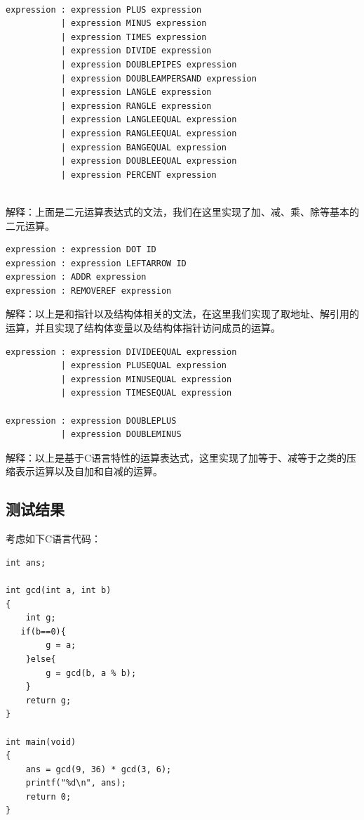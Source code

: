 \documentclass{article}
\begin{document}
\begin{verbatim}

expression : expression PLUS expression
           | expression MINUS expression
           | expression TIMES expression
           | expression DIVIDE expression
           | expression DOUBLEPIPES expression
           | expression DOUBLEAMPERSAND expression
           | expression LANGLE expression
           | expression RANGLE expression
           | expression LANGLEEQUAL expression
           | expression RANGLEEQUAL expression
           | expression BANGEQUAL expression
           | expression DOUBLEEQUAL expression
           | expression PERCENT expression
           
\end{verbatim}

解释：上面是二元运算表达式的文法，我们在这里实现了加、减、乘、除等基本的二元运算。

\begin{verbatim}
expression : expression DOT ID
expression : expression LEFTARROW ID
expression : ADDR expression
expression : REMOVEREF expression
\end{verbatim}

解释：以上是和指针以及结构体相关的文法，在这里我们实现了取地址、解引用的运算，并且实现了结构体变量以及结构体指针访问成员的运算。

\begin{verbatim}
expression : expression DIVIDEEQUAL expression
           | expression PLUSEQUAL expression
           | expression MINUSEQUAL expression
           | expression TIMESEQUAL expression

expression : expression DOUBLEPLUS
           | expression DOUBLEMINUS
\end{verbatim}

解释：以上是基于C语言特性的运算表达式，这里实现了加等于、减等于之类的压缩表示运算以及自加和自减的运算。

\subsection{测试结果}

考虑如下C语言代码：

\begin{verbatim}
int ans;

int gcd(int a, int b)
{
    int g;
   if(b==0){
        g = a;
    }else{
        g = gcd(b, a % b);
    }
    return g;
}

int main(void)
{
    ans = gcd(9, 36) * gcd(3, 6);
    printf("%d\n", ans);
    return 0;
}
\end{verbatim}
\end{document}
